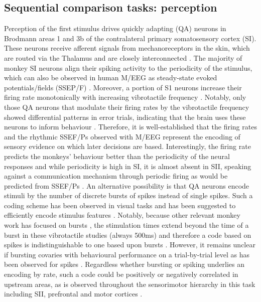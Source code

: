 \subsection{Sequential comparison tasks: perception}
Perception of the first stimulus drives quickly adapting (QA) neurons in Brodmann areas 1 and 3b of the contralateral primary somatosensory cortex (SI). These neurons receive afferent signals from mechanoreceptors in the skin, which are routed via the Thalamus and are closely interconnected \parencite{Merzenich1969,Mountcastle1967,Talbot1968}. The majority of monkey SI neurons align their spiking activity to the periodicity of the stimulus, which can also be observed in human M/EEG as steady-state evoked potentials/fields (SSEP/F) \parencite{Mountcastle1990,Nangini2006,Tobimatsu1999}. Moreover, a portion of S1 neurons increase their firing rate monotonically with increasing vibrotactile frequency \parencite{Hernandez2010,Hernandez2000,Lemus2010,Luna2005,Salinas2000}. Notably, only those QA neurons that modulate their firing rates by the vibrotactile frequency showed differential patterns in error trials, indicating that the brain uses these neurons to inform behaviour \parencite{Salinas2000}. Therefore, it is well-established that the firing rates and the rhythmic SSEF/Ps observed with M/EEG represent the encoding of sensory evidence on which later decisions are based. Interestingly, the firing rate predicts the monkeys’ behaviour better than the periodicity of the neural responses and while periodicity is high in SI, it is almost absent in SII, speaking against a communication mechanism through periodic firing as would be predicted from SSEF/Ps \parencite{Hernandez2000,Luna2005,Salinas2000}. An alternative possibility is that QA neurons encode stimuli by the number of discrete bursts of spikes instead of single spikes. Such a coding scheme has been observed in visual tasks and has been suggested to efficiently encode stimulus features  \parencite{Kepecs2003,Kepecs2002,Krahe2004,Reinagel1999,Romo2013}. Notably, because other relevant monkey work has focused on bursts \parencite[e.g.,][]{Lundqvist2016}, the stimulation times extend beyond the time of a burst in these vibrotactile studies (always 500ms) and therefore a code based on spikes is indistinguishable to one based upon bursts \parencite{Romo2013}. However, it remains unclear if bursting covaries with behavioural performance on a trial-by-trial level as has been observed for spikes \parencite{Luna2005}. Regardless whether bursting or spiking underlies an encoding by rate, such a code could be positively or negatively correlated in upstream areas, as is observed throughout the sensorimotor hierarchy in this task including SII, prefrontal and motor cortices \parencite{Hernandez2010,Salinas2000}.

